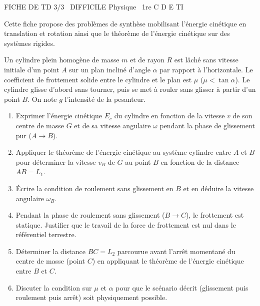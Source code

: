 \documentclass[11pt]{article}
\begin{document}
\begin{tcolorbox}[enhanced,colback=popink,colframe=popink,arc=10pt,boxrule=0pt,left=12pt,right=12pt,top=9pt,bottom=9pt]
{\color{white}\popxbold\small FICHE DE TD 3/3 \textbullet\ DIFFICILE \hfill Physique \textbullet\ 1re C D E TI\par}
\end{tcolorbox}
\vspace{4pt}
Cette fiche propose des problèmes de synthèse mobilisant l'énergie cinétique en translation et rotation ainsi que le théorème de l'énergie cinétique sur des systèmes rigides.

\begin{exercice}
Un cylindre plein homogène de masse $m$ et de rayon $R$ est lâché sans vitesse initiale d'un point $A$ sur un plan incliné d'angle $\alpha$ par rapport à l'horizontale. Le coefficient de frottement solide entre le cylindre et le plan est $\mu$ ($\mu < \tan\alpha$). Le cylindre glisse d'abord sans tourner, puis se met à rouler sans glisser à partir d'un point $B$. On note $g$ l'intensité de la pesanteur.
\begin{enumerate}
    \item Exprimer l'énergie cinétique $E_c$ du cylindre en fonction de la vitesse $v$ de son centre de masse $G$ et de sa vitesse angulaire $\omega$ pendant la phase de glissement pur ($A \to B$).
    \item Appliquer le théorème de l'énergie cinétique au système cylindre entre $A$ et $B$ pour déterminer la vitesse $v_B$ de $G$ au point $B$ en fonction de la distance $AB = L_1$.
    \item Écrire la condition de roulement sans glissement en $B$ et en déduire la vitesse angulaire $\omega_B$.
    \item Pendant la phase de roulement sans glissement ($B \to C$), le frottement est statique. Justifier que le travail de la force de frottement est nul dans le référentiel terrestre.
    \item Déterminer la distance $BC = L_2$ parcourue avant l'arrêt momentané du centre de masse (point $C$) en appliquant le théorème de l'énergie cinétique entre $B$ et $C$.
    \item Discuter la condition sur $\mu$ et $\alpha$ pour que le scénario décrit (glissement puis roulement puis arrêt) soit physiquement possible.
\end{enumerate}
\end{exercice}
\end{document}
